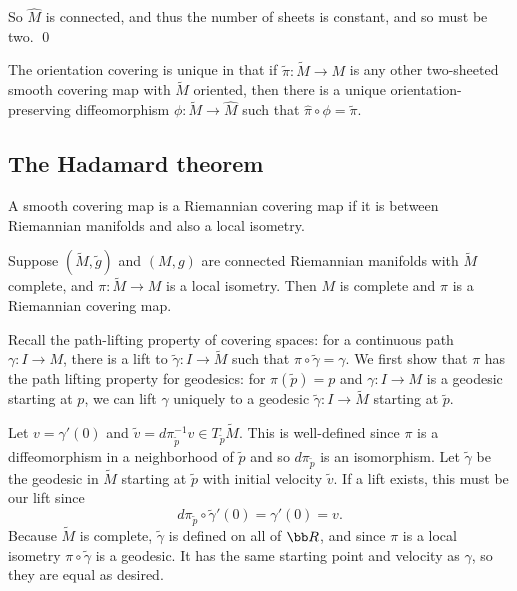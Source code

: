     So $\hat M$ is connected, and thus the number of sheets is constant, and so must be two.
    \qed

\eproof

The orientation covering is unique in that if $\tilde\pi\colon\tilde M\to M$ is any other two-sheeted smooth covering
map with $\tilde M$ oriented, then there is a unique orientation-preserving diffeomorphism $\phi\colon\tilde M\to\hat M$
such that $\hat\pi\circ\phi=\tilde\pi$.

\subsection{The Hadamard theorem}

\bdefn

    A smooth covering map is a {\emphcolor Riemannian covering map} if it is between Riemannian manifolds and also a local isometry.

\edefn

\bthrm

    Suppose $(\tilde M,\tilde g)$ and $(M,g)$ are connected Riemannian manifolds with $\tilde M$ complete, and $\pi\colon\tilde M\to M$ is a local isometry.
    Then $M$ is complete and $\pi$ is a Riemannian covering map.

\ethrm

\bproof

    Recall the path-lifting property of covering spaces: for a continuous path $\gamma\colon I\to M$, there is a lift to $\tilde\gamma\colon I\to\tilde M$ such
    that $\pi\circ\tilde\gamma=\gamma$.
    We first show that $\pi$ has the path lifting property for geodesics: for $\pi(\tilde p)=p$ and $\gamma\colon I\to M$ is a geodesic starting at $p$, we can
    lift $\gamma$ uniquely to a geodesic $\tilde\gamma\colon I\to\tilde M$ starting at $\tilde p$.

    Let $v=\gamma'(0)$ and $\tilde v=d\pi_{\tilde p}^{-1}v\in T_{\tilde p}\tilde M$.
    This is well-defined since $\pi$ is a diffeomorphism in a neighborhood of $\tilde p$ and so $d\pi_{\tilde p}$ is an isomorphism.
    Let $\tilde\gamma$ be the geodesic in $\tilde M$ starting at $\tilde p$ with initial velocity $\tilde v$.
    If a lift exists, this must be our lift since
    $$ d\pi_{\tilde p}\circ\tilde\gamma'(0) = \gamma'(0) = v . $$
    Because $\tilde M$ is complete, $\tilde\gamma$ is defined on all of $\bR$, and since $\pi$ is a local isometry $\pi\circ\tilde\gamma$ is a geodesic.
    It has the same starting point and velocity as $\gamma$, so they are equal as desired.

